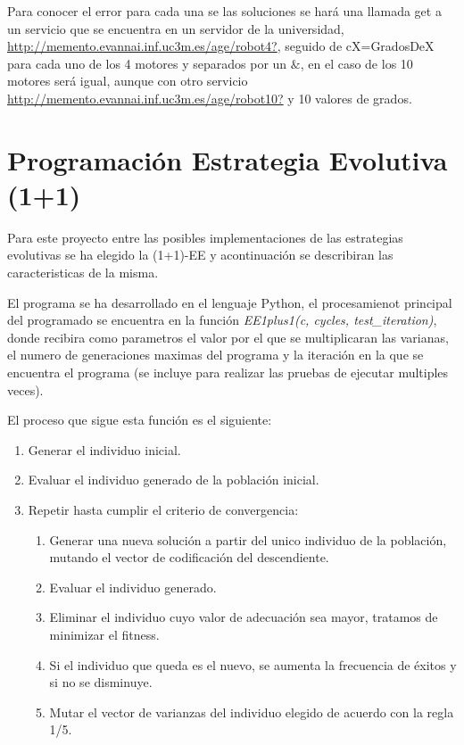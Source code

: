 \documentclass[12pt, spanish, pdftex]{UC3M_document}
\begin{document}
Para conocer el error para cada una se las soluciones se hará una llamada get a un servicio que se encuentra en un servidor de la universidad, \href{http://memento.evannai.inf.uc3m.es/age/robot4?}{http://memento.evannai.inf.uc3m.es/age/robot4?}, seguido de cX=GradosDeX para cada uno de los 4 motores y separados por un $\&$, en el caso de los 10 motores será igual, aunque con otro servicio \href{http://memento.evannai.inf.uc3m.es/age/robot10?}{http://memento.evannai.inf.uc3m.es/age/robot10?} y 10 valores de grados.

\section{Programación Estrategia Evolutiva (1+1)}
Para este proyecto entre las posibles implementaciones de las estrategias evolutivas se ha elegido la (1+1)-EE y acontinuación se describiran las caracteristicas de la misma. 

El programa se ha desarrollado en el lenguaje Python, el procesamienot principal del programado se encuentra en la función \textit{EE1plus1(c, cycles, test\_iteration)}, donde recibira como parametros el valor por el que se multiplicaran las varianas, el numero de generaciones maximas del programa y la iteración en la que se encuentra el programa (se incluye para realizar las pruebas de ejecutar multiples veces).

El proceso que sigue esta función es el siguiente:
\begin{enumerate}
	\item Generar el individuo inicial.
	\item Evaluar el individuo generado de la población inicial.
	\item Repetir hasta cumplir el criterio de convergencia:
	\begin{enumerate}
		\item Generar una nueva solución a partir del unico individuo de la población, mutando el vector de codificación del descendiente.
		\item Evaluar el individuo generado.
		\item Eliminar el individuo cuyo valor de adecuación sea mayor, tratamos de minimizar el fitness.
		\item Si el individuo que queda es el nuevo, se aumenta la frecuencia de éxitos y si no se disminuye.
		\item Mutar el vector de varianzas del individuo elegido de acuerdo con la regla 1/5.
	\end{enumerate}
\end{enumerate}
\end{document}
